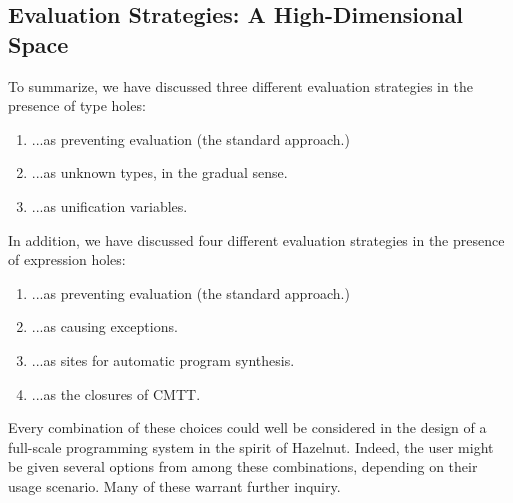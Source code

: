 \documentclass[preprint,9pt]{sigplanconf}
\begin{document}
\subsection{Evaluation Strategies: A High-Dimensional Space}
To summarize, we have discussed three different evaluation strategies in the presence of type holes:
\begin{enumerate}[noitemsep]
\item ...as preventing evaluation (the standard approach.)
\item ...as unknown types, in the gradual sense.
\item ...as unification variables.
\end{enumerate}
In addition, we have discussed four different evaluation strategies in the presence of expression holes:
\begin{enumerate}[noitemsep]
\item ...as preventing evaluation (the standard approach.)
\item ...as causing exceptions.
\item ...as sites for automatic program synthesis.
\item ...as the closures of CMTT.
\end{enumerate}

Every combination of these choices could well be considered in the design of a full-scale programming system in the spirit of Hazelnut. Indeed, the user might be given several options from among these combinations, depending on their usage scenario. Many of these warrant further inquiry.




\end{document}
